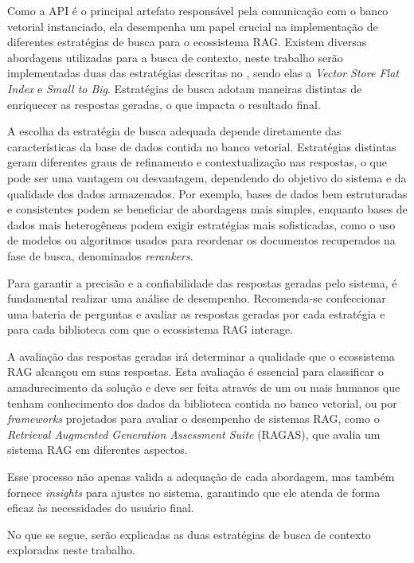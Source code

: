 \documentclass[a4paper, 12pt]{article}
\newcommand{\citeb}[1]{\bibleftbracket\cite{#1}\bibrightbracket}
\begin{document}
    Como a API é o principal artefato responsável pela comunicação com o banco vetorial instanciado, ela desempenha um papel crucial na implementação de diferentes estratégias de busca para o ecossistema RAG. Existem diversas abordagens utilizadas para a busca de contexto, neste trabalho serão implementadas duas das estratégias descritas no , \citeb{retrieval_strategies} sendo elas a \textit{Vector Store Flat Index} e \textit{Small to Big}. Estratégias de busca adotam maneiras distintas de enriquecer as respostas geradas, o que impacta o resultado final.

    A escolha da estratégia de busca adequada depende diretamente das características da base de dados contida no banco vetorial. Estratégias distintas geram diferentes graus de refinamento e contextualização nas respostas, o que pode ser uma vantagem ou desvantagem, dependendo do objetivo do sistema e da qualidade dos dados armazenados. Por exemplo, bases de dados bem estruturadas e consistentes podem se beneficiar de abordagens mais simples, enquanto bases de dados mais heterogêneas podem exigir estratégias mais sofisticadas, como o uso de modelos ou algoritmos usados para reordenar os documentos recuperados na fase de busca, denominados \textit{rerankers}.

    Para garantir a precisão e a confiabilidade das respostas geradas pelo sistema, é fundamental realizar uma análise de desempenho. Recomenda-se confeccionar uma bateria de perguntas e avaliar as respostas geradas por cada estratégia e para cada biblioteca com que o ecossistema RAG interage.

    A avaliação das respostas geradas irá determinar a qualidade que o ecossistema RAG alcançou em suas respostas. Esta avaliação é essencial para classificar o amadurecimento da solução e deve ser feita através de um ou mais humanos que tenham conhecimento dos dados da biblioteca contida no banco vetorial, ou por \textit{frameworks} projetados para avaliar o desempenho de sistemas RAG, como o \textit{Retrieval Augmented Generation Assessment Suite} (RAGAS), que avalia um sistema RAG em diferentes aspectos.
    
    Esse processo não apenas valida a adequação de cada abordagem, mas também fornece \textit{insights} para ajustes no sistema, garantindo que ele atenda de forma eficaz às necessidades do usuário final.

    No que se segue, serão explicadas as duas estratégias de busca de contexto exploradas neste trabalho.
\end{document}
